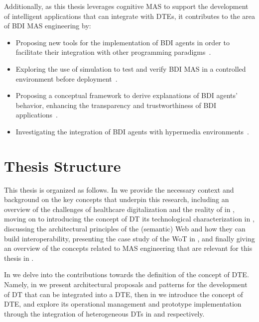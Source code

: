 Additionally, as this thesis leverages cognitive \ac{MAS} to support the development of intelligent applications that can integrate with \acp{DTE}, it contributes to the area of \ac{BDI} \ac{MAS} engineering by:  
\begin{itemize}
  \item Proposing new tools for the implementation of \ac{BDI} agents in order to facilitate their integration with other programming paradigms~\missingref{}.
  \item Exploring the use of simulation to test and verify \ac{BDI} \ac{MAS} in a controlled environment before deployment~\missingref{}.
  \item Proposing a conceptual framework to derive explanations of \ac{BDI} agents' behavior, enhancing the transparency and trustworthiness of \ac{BDI} applications~\missingref{}.
  \item Investigating the integration of \ac{BDI} agents with hypermedia environments~\missingref{}.
\end{itemize}


\section*{Thesis Structure}

This thesis is organized as follows. 
In  we provide the necessary context and background on the key concepts that underpin this research, including an overview of the challenges of healthcare digitalization and the reality of \ausl{} in ,
moving on to introducing the concept of \ac{DT} its technological characterization  in ,
discussing the architectural principles of the (semantic) Web and how they can build interoperability, presenting the case study of the \ac{WoT} in ,
and finally giving an overview of the concepts related to \ac{MAS} engineering that are relevant for this thesis in .

In  we delve into the contributions towards the definition of the concept of \ac{DTE}. Namely, in  we present architectural proposals and patterns for the development of \ac{DT} that can be integrated into a \ac{DTE}, then in  we introduce the concept of \ac{DTE}, and explore its operational management and prototype implementation through the integration of heterogeneous \acp{DT} in  and  respectively.


